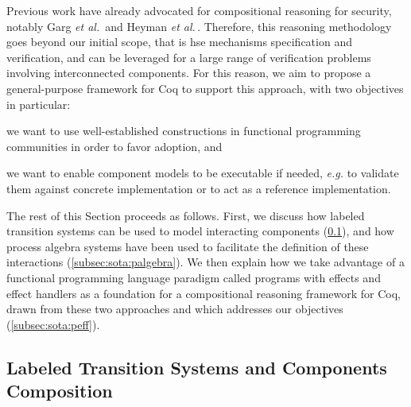 Previous work have already advocated for compositional reasoning for security,
notably Garg \emph{et al.}\,\cite{garg2010compositional} and Heyman \emph{et
  al.}\,\cite{heyman2012securemodel}.
%
Therefore, this reasoning methodology goes beyond our initial scope, that is
\ac{hse} mechanisms specification and verification, and can be leveraged for a
large range of verification problems involving interconnected components.
%
For this reason, we aim to propose a general-purpose framework for Coq to
support this approach, with two objectives in particular:
%
\begin{inparaenum}[(1)]
\item we want to use well-established constructions in functional programming
  communities  in order to favor adoption, and
\item we want to enable component models to be executable if needed, \emph{e.g.}
  to validate them against concrete implementation or to act as a reference
  implementation.
\end{inparaenum}

The rest of this Section proceeds as follows.
%
First, we discuss how labeled transition systems can be used to model
interacting components (\ref{subsec:sota:ioauto}), and how process algebra
systems have been used to facilitate the definition of these interactions
(\ref{subsec:sota:palgebra}).
%
  We then
explain how we take advantage of a functional programming language   paradigm called programs with effects and effect handlers as a
foundation for a compositional reasoning framework for Coq, drawn from these two
approaches  and which addresses our objectives
(\ref{subsec:sota:peff}).

\subsection{Labeled Transition Systems and Components Composition}
\label{subsec:sota:ioauto}

